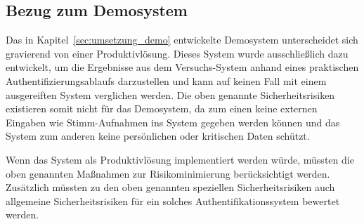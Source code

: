 
\subsection{Bezug zum Demosystem}

Das in Kapitel~\ref{sec:umsetzung_demo} entwickelte Demosystem unterscheidet sich gravierend von einer Produktivlösung.
Dieses System wurde ausschließlich dazu entwickelt, um die Ergebnisse aus dem Versuchs-System anhand eines praktischen Authentifizierungsablaufs darzustellen und kann auf keinen Fall mit einem ausgereiften System verglichen werden.
Die oben genannte Sicherheitsrisiken existieren somit nicht für das Demosystem, da zum einen keine externen Eingaben wie Stimm-Aufnahmen ins System gegeben werden können und das System zum anderen keine persönlichen oder kritischen Daten schützt.

Wenn das System als Produktivlösung implementiert werden würde, müssten die oben genannten Maßnahmen zur Risikominimierung berücksichtigt werden.
Zusätzlich müssten zu den oben genannten speziellen Sicherheitsrisiken auch allgemeine Sicherheitsrisiken für ein solches Authentifikationssystem bewertet werden.
